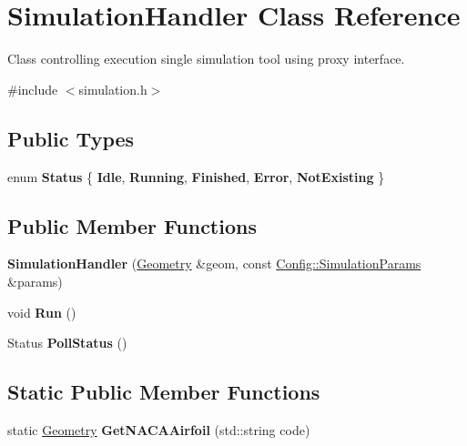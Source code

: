 \hypertarget{class_simulation_handler}{}\section{Simulation\+Handler Class Reference}
\label{class_simulation_handler}


Class controlling execution single simulation tool using proxy interface.  




{\ttfamily \#include $<$simulation.\+h$>$}

\subsection*{Public Types}
\begin{DoxyCompactItemize}
\item 
\hypertarget{class_simulation_handler_ab8941e6ab3f4e26795276dad882bec9e}{}\label{class_simulation_handler_ab8941e6ab3f4e26795276dad882bec9e} 
enum {\bfseries Status} \{ \newline
{\bfseries Idle}, 
{\bfseries Running}, 
{\bfseries Finished}, 
{\bfseries Error}, 
\newline
{\bfseries Not\+Existing}
 \}
\end{DoxyCompactItemize}
\subsection*{Public Member Functions}
\begin{DoxyCompactItemize}
\item 
\hypertarget{class_simulation_handler_af10fc8a2ac5266092b65c8fc0246381b}{}\label{class_simulation_handler_af10fc8a2ac5266092b65c8fc0246381b} 
{\bfseries Simulation\+Handler} (\hyperlink{class_geometry}{Geometry} \&geom, const \hyperlink{struct_config_1_1_simulation_params}{Config\+::\+Simulation\+Params} \&params)
\item 
\hypertarget{class_simulation_handler_a56ca919f342adb4b32b6082683c80c0a}{}\label{class_simulation_handler_a56ca919f342adb4b32b6082683c80c0a} 
void {\bfseries Run} ()
\item 
\hypertarget{class_simulation_handler_a6889a8713f39c76bdb73b1332ee2c12b}{}\label{class_simulation_handler_a6889a8713f39c76bdb73b1332ee2c12b} 
Status {\bfseries Poll\+Status} ()
\end{DoxyCompactItemize}
\subsection*{Static Public Member Functions}
\begin{DoxyCompactItemize}
\item 
\hypertarget{class_simulation_handler_ad3a628d847faaeca6170f8eb396848e8}{}\label{class_simulation_handler_ad3a628d847faaeca6170f8eb396848e8} 
static \hyperlink{class_geometry}{Geometry} {\bfseries Get\+N\+A\+C\+A\+Airfoil} (std\+::string code)
\end{DoxyCompactItemize}
